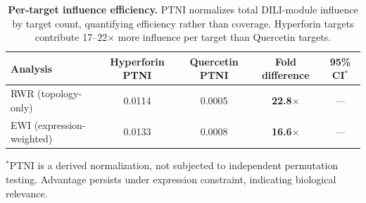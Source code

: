 \begin{table}[ht]
\centering
\caption{\textbf{Per-target influence efficiency.}
PTNI normalizes total DILI-module influence by target count, quantifying efficiency rather than coverage.
Hyperforin targets contribute 17--22$\times$ more influence per target than Quercetin targets.}
\label{tab:ptni}
\vspace{0.5em}
\begin{tabular}{@{}lcccc@{}}
\toprule
\textbf{Analysis} & \textbf{Hyperforin PTNI} & \textbf{Quercetin PTNI} & \textbf{Fold difference} & \textbf{95\% CI}$^*$ \\
\midrule
RWR (topology-only) & 0.0114 & 0.0005 & \textbf{22.8}$\times$ & --- \\
EWI (expression-weighted) & 0.0133 & 0.0008 & \textbf{16.6}$\times$ & --- \\
\bottomrule
\end{tabular}

\vspace{0.3em}
\begin{minipage}{\linewidth}
\footnotesize
$^*$PTNI is a derived normalization, not subjected to independent permutation testing. Advantage persists under expression constraint, indicating biological relevance.
\end{minipage}
\end{table}

